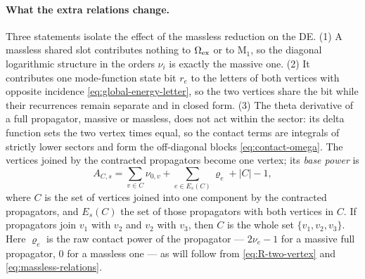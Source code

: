 \documentclass[11pt,a4paper]{article}
\numberwithin{table}{section}
\begin{document}
\paragraph{What the extra relations change.}
Three statements isolate the effect of the massless reduction on the DE. (1) A massless shared
slot contributes nothing to $\Omega_{\rm ex}$ or to $\text{M}_1$, so the diagonal logarithmic
structure in the orders $\nu_i$ is exactly the massive one. (2) It contributes one
mode-function state bit $r_e$ to the letters of both vertices with opposite incidence
\eqref{eq:global-energy-letter}, so the two vertices share the bit while their recurrences
remain separate and in closed form. (3) The theta derivative of a full propagator, massive or
massless, does not act within the sector: its delta function sets the two vertex times equal,
so the contact terms are integrals of strictly lower sectors and form the off-diagonal blocks
\eqref{eq:contact-omega}. The vertices joined by the contracted propagators become one vertex;
its \emph{base power} is
\begin{equation}
  A_{C,s}=\sum_{v\in C}\nu_{0,v}+\sum_{e\in E_s(C)}\varrho_e+|C|-1,
  \label{eq:base-power}
\end{equation}
where $C$ is the set of vertices joined into one component by the contracted propagators, and
$E_s(C)$ the set of those propagators with both vertices in $C$. If propagators join $v_1$ with
$v_2$ and $v_2$ with $v_3$, then $C$ is the whole set $\{v_1,v_2,v_3\}$. Here $\varrho_e$ is
the raw contact power of the propagator --- $2\nu_e-1$ for a massive full propagator, $0$ for a
massless one --- as will follow from \eqref{eq:R-two-vertex} and \eqref{eq:massless-relations}.
\end{document}
